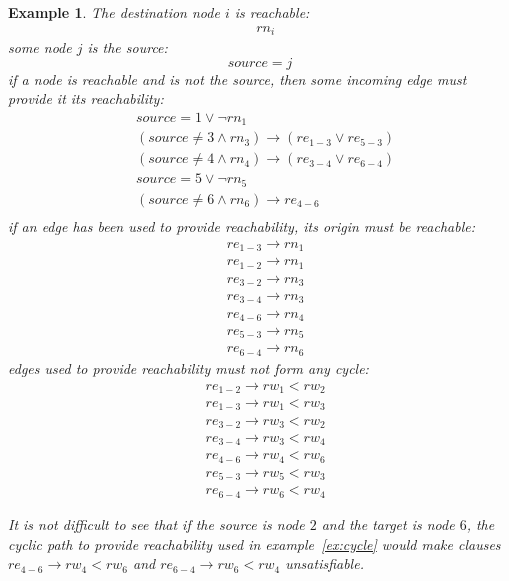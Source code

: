 \documentclass{report}
\theoremstyle{plain}
\newtheorem{example}{Example}[section]
\begin{document}
\begin{example}
The destination node $i$ is reachable:
\begin{align*}
& rn_i
\end{align*}
some node $j$ is the source:
$$
source = j
$$
if a node is reachable and is not the source, then some incoming edge must provide it its reachability:
\begin{align*}
& source=1 \vee \lnot  rn_1 \\
& (source \neq 3 \wedge rn_3) \rightarrow (re_{1-3} \vee re_{5-3})\\
& (source \neq 4 \wedge rn_4) \rightarrow (re_{3-4} \vee re_{6-4}) \\
& source=5 \vee \lnot  rn_5 \\
& (source \neq 6 \wedge rn_6) \rightarrow re_{4-6} \\
\end{align*}
if an edge has been used to provide reachability, its origin must be reachable:
\begin{align*}
& re_{1-3} \rightarrow rn_1 \\
& re_{1-2} \rightarrow rn_1 \\
& re_{3-2} \rightarrow rn_3 \\
& re_{3-4} \rightarrow rn_3 \\
& re_{4-6} \rightarrow rn_4 \\
& re_{5-3} \rightarrow rn_5 \\
& re_{6-4} \rightarrow rn_6
\end{align*}
edges used to provide reachability must not form any cycle:
\begin{align*}
& re_{1-2} \rightarrow rw_1 < rw_2 \\
& re_{1-3} \rightarrow rw_1 < rw_3 \\
& re_{3-2} \rightarrow rw_3 < rw_2 \\
& re_{3-4} \rightarrow rw_3 < rw_4 \\
& re_{4-6} \rightarrow rw_4 < rw_6 \\
& re_{5-3} \rightarrow rw_5 < rw_3 \\
& re_{6-4} \rightarrow rw_6 < rw_4
\end{align*}

It is not difficult to see that if the source is node $2$ and the target is node $6$, the cyclic path to provide reachability used in example~\ref{ex:cycle} would make clauses $re_{4-6} \rightarrow rw_4 < rw_6$ and $re_{6-4} \rightarrow rw_6 < rw_4$ unsatisfiable.
\end{example}
\end{document}
